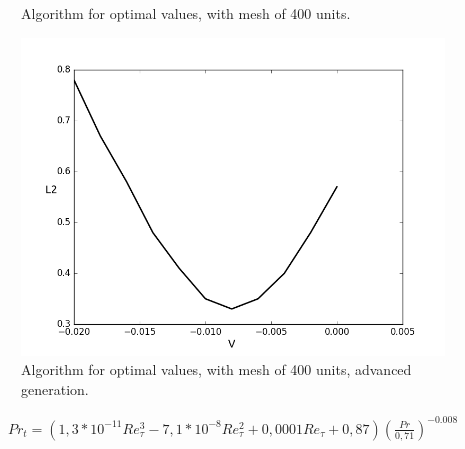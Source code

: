\documentclass[xcolor=dvipsnames,8pt,aspectratio=34]{beamer}
\begin{document}
\begin{frame}
\begin{minipage}[h!]{0.32\textwidth}
\begin{figure}
				\caption{Algorithm for optimal values, with mesh of 400 units.}
			\end{figure}
		\end{minipage}
		\begin{minipage}[h!]{0.32\textwidth}
			\begin{figure}
				\centering
				\includegraphics[angle=0, scale=0.19]{A400zoon}
				\caption{Algorithm for optimal values, with mesh of 400 units, advanced generation.}
			\end{figure}
		\end{minipage}	
		\begin{equation}
		\begin{split}
		Pr_t = \left( 1,3 * 10^{-11} Re_\tau^3 - 7,1 * 10^{-8} Re_\tau^2 + 0,0001 Re_\tau + 0,87 \right) \left(  \frac{Pr}{0,71}\right) ^{-0.008}
		\end{split}
		\end{equation}	
		\end{frame}	
	
	
	
	
	
\end{document}
